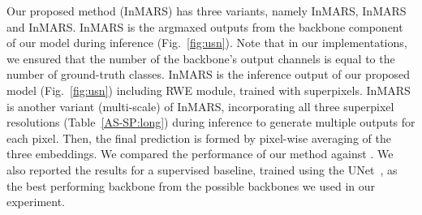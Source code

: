 \documentclass[letterpaper, 10 pt, journal, twoside]{IEEEtran}
\newcommand{\Fig}{Fig.\xspace}
\begin{document}
Our proposed method (InMARS) has three variants, namely InMARS, InMARS and InMARS. InMARS is the argmaxed outputs from the backbone component of our model during inference (\Fig~\ref{fig:usn}). Note that in our implementations, we ensured that the number of the backbone's output channels is equal to the number of ground-truth classes. InMARS is the inference output of our proposed model (\Fig~\ref{fig:usn}) including RWE module, trained with  superpixels. InMARS is another variant (multi-scale) of InMARS, incorporating all three superpixel resolutions (Table~\ref{AS-SP:long}) during inference to generate multiple outputs for each pixel. Then, the final prediction is formed by pixel-wise averaging of the three embeddings. We compared the performance of our method against \cite{ IIC, ARL,Pedregosa2011scikit-learn, Lowe:2004:DIF:993451.996342, Doersch, isola2015learning, DeepCluster}. We also reported the results for a supervised baseline, trained using the UNet~\cite{UNet}, as the best performing backbone from the possible backbones we used in our experiment.\par
\end{document}
